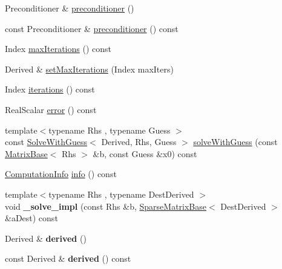 \begin{DoxyCompactItemize}
\item 
Preconditioner \& \mbox{\hyperlink{class_eigen_1_1_iterative_solver_base_a5e88f2a323a2900205cf807af94f8051}{preconditioner}} ()
\item 
const Preconditioner \& \mbox{\hyperlink{class_eigen_1_1_iterative_solver_base_a709a056e17c49b5272e4971bc376cbe4}{preconditioner}} () const
\item 
Index \mbox{\hyperlink{class_eigen_1_1_iterative_solver_base_a168a74c8dceb6233b220031fdd756ba0}{max\+Iterations}} () const
\item 
Derived \& \mbox{\hyperlink{class_eigen_1_1_iterative_solver_base_af83de7a7d31d9d4bd1fef6222b07335b}{set\+Max\+Iterations}} (Index max\+Iters)
\item 
Index \mbox{\hyperlink{class_eigen_1_1_iterative_solver_base_ae778dd098bd5e6655625b20b1e9f15da}{iterations}} () const
\item 
Real\+Scalar \mbox{\hyperlink{class_eigen_1_1_iterative_solver_base_a117c241af3fb1141ad0916a3cf3157ec}{error}} () const
\item 
{\footnotesize template$<$typename Rhs , typename Guess $>$ }\\const \mbox{\hyperlink{class_eigen_1_1_solve_with_guess}{Solve\+With\+Guess}}$<$ Derived, Rhs, Guess $>$ \mbox{\hyperlink{class_eigen_1_1_iterative_solver_base_adcc18d1ab283786dcbb5a3f63f4b4bd8}{solve\+With\+Guess}} (const \mbox{\hyperlink{class_eigen_1_1_matrix_base}{Matrix\+Base}}$<$ Rhs $>$ \&b, const Guess \&x0) const
\item 
\mbox{\hyperlink{group__enums_ga85fad7b87587764e5cf6b513a9e0ee5e}{Computation\+Info}} \mbox{\hyperlink{class_eigen_1_1_iterative_solver_base_a0d6b459433a316b4f12d48e5c80d61fe}{info}} () const
\item 
\mbox{\label{class_eigen_1_1_iterative_solver_base_a7c2a35dde0ddb891b4030143ed286743}} 
{\footnotesize template$<$typename Rhs , typename Dest\+Derived $>$ }\\void {\bfseries \+\_\+solve\+\_\+impl} (const Rhs \&b, \mbox{\hyperlink{class_eigen_1_1_sparse_matrix_base}{Sparse\+Matrix\+Base}}$<$ Dest\+Derived $>$ \&a\+Dest) const
\item 
\mbox{\label{class_eigen_1_1_iterative_solver_base_ad213fb2c2199ca597b96f1f79653637f}} 
Derived \& {\bfseries derived} ()
\item 
\mbox{\label{class_eigen_1_1_iterative_solver_base_af5f23a7e048060c3082c5a1ddfa91932}} 
const Derived \& {\bfseries derived} () const
\end{DoxyCompactItemize}
